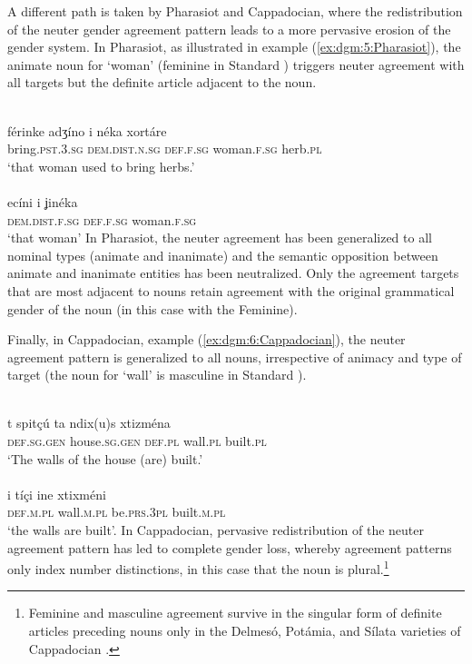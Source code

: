\documentclass[output=collectionpaper]{langsci/langscibook}
\begin{document}
A different path is taken by Pharasiot and Cappadocian, where the redistribution of the neuter gender agreement pattern leads to a more pervasive erosion of the gender system. In Pharasiot,  as illustrated in example (\ref{ex:dgm:5:Pharasiot}), the animate noun for `woman' (feminine in Standard ) triggers neuter agreement with all targets but the definite article adjacent to the noun.

\ea\label{ex:dgm:5:Pharasiot}
\ea
{}\\
\gll f\'erinke adʒ\'ino i n\'eka xort\'are \\
bring.\textsc{pst.3.sg} \textsc{dem.dist.n.sg} \textsc{def.f.sg} woman.\textsc{f.sg} herb.\textsc{pl} \\
\glt `that woman used to bring herbs.'\\
\ex
{}\\
 \gll ec\'ini i ʝin\'eka \\
 \textsc{dem.dist.f.sg} \textsc{def.f.sg} woman.\textsc{f.sg} \\
 \glt `that woman'
\z
\z
In Pharasiot, the neuter agreement has been generalized to all nominal types (animate and inanimate) and the semantic opposition between animate and inanimate entities has been neutralized. Only the agreement targets that are most adjacent to nouns retain agreement with the original grammatical gender of the noun (in this case with the Feminine).

Finally, in Cappadocian, example (\ref{ex:dgm:6:Cappadocian}), the neuter agreement pattern is generalized to all nouns, irrespective of animacy and type of target (the noun for `wall' is masculine in Standard ).

\ea\label{ex:dgm:6:Cappadocian}
\ea
{}\\
\gll t spit\c{c}\'u ta ndix(u)s xtizm\'ena \\
\textsc{def.sg.gen} house.\textsc{sg.gen} \textsc{def.pl} wall.\textsc{pl} built.\textsc{pl} \\
\glt `The walls of the house (are) built.'\\
\ex
{}\\
\gll i t\'i\c{c}i ine xtixm\'eni \\
\textsc{def.m.pl} wall\textsc{.m.pl} be.\textsc{prs.3pl} built.\textsc{m.pl} \\
\glt `the walls are built'.
\z
\z
In Cappadocian, pervasive redistribution of the neuter agreement pattern has led to complete gender loss, whereby agreement patterns only index number distinctions, in this case that the noun is plural.\footnote{Feminine and masculine agreement survive in the singular form of definite articles preceding nouns only in the Delmes\'o, Pot\'amia, and S\'ilata varieties of Cappadocian \citep[97]{Karatsareas2014}.}
\end{document}
